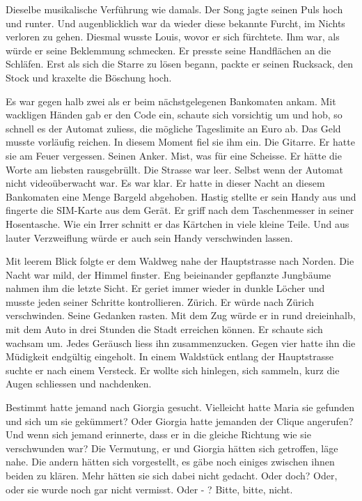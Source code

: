 
Dieselbe musikalische Verführung wie damals. Der Song jagte seinen Puls hoch und runter. Und augenblicklich war da
wieder diese bekannte Furcht, im Nichts verloren zu gehen. Diesmal wusste Louis, wovor er sich fürchtete.
Ihm war, als würde er seine Beklemmung schmecken.
Er presste seine Handflächen an die Schläfen. 
Erst als sich die Starre zu lösen begann, packte er seinen Rucksack, den Stock und kraxelte die Böschung hoch.

\sectionbreak

Es war gegen halb zwei als er beim nächstgelegenen Bankomaten ankam. Mit
wackligen Händen gab er den Code ein, schaute sich vorsichtig um und hob, so schnell es der Automat zuliess, die mögliche Tageslimite an Euro ab. Das Geld musste vorläufig reichen. 
In diesem Moment fiel sie ihm ein. Die Gitarre. Er hatte sie am Feuer
vergessen. Seinen Anker. Mist, was für eine Scheisse. Er hätte die Worte
am liebsten rausgebrüllt.
Die Strasse war leer. Selbst wenn der Automat nicht videoüberwacht war.
Es war klar. Er hatte in dieser Nacht an diesem Bankomaten eine Menge
Bargeld abgehoben. 
Hastig stellte er sein Handy aus und fingerte die SIM-Karte aus dem
Gerät. Er griff nach dem Taschenmesser in seiner Hosentasche. Wie ein
Irrer schnitt er das Kärtchen in viele kleine Teile. Und aus lauter
Verzweiflung würde er auch sein Handy verschwinden lassen.

Mit leerem Blick folgte er dem Waldweg nahe der Hauptstrasse 
nach Norden. Die Nacht war mild, der Himmel finster. Eng beieinander gepflanzte Jungbäume 
nahmen ihm die letzte Sicht. Er geriet immer wieder in dunkle Löcher und musste jeden seiner Schritte kontrollieren.
Zürich. Er würde nach Zürich verschwinden. Seine Gedanken rasten. 
Mit dem Zug würde er in rund dreieinhalb, mit dem Auto in drei Stunden die Stadt erreichen können.
Er schaute sich wachsam um. Jedes Geräusch liess ihn zusammenzucken. 
Gegen vier hatte ihn die Müdigkeit endgültig eingeholt. In einem
Waldstück entlang der Hauptstrasse suchte er nach einem Versteck. Er
wollte sich hinlegen, sich sammeln, kurz die Augen schliessen und
nachdenken.

Bestimmt hatte jemand nach Giorgia gesucht. Vielleicht hatte Maria sie
gefunden und sich um sie gekümmert?
Oder Giorgia hatte jemanden der Clique angerufen?
Und wenn sich jemand erinnerte, dass er in die gleiche Richtung wie sie
verschwunden war? Die Vermutung, er und Giorgia hätten sich getroffen, läge nahe. Die 
andern hätten sich vorgestellt, es gäbe noch einiges zwischen ihnen beiden zu klären. 
Mehr hätten sie sich dabei nicht gedacht. Oder doch? 
Oder, oder sie wurde noch gar nicht vermisst. Oder - ? Bitte, bitte, nicht.


